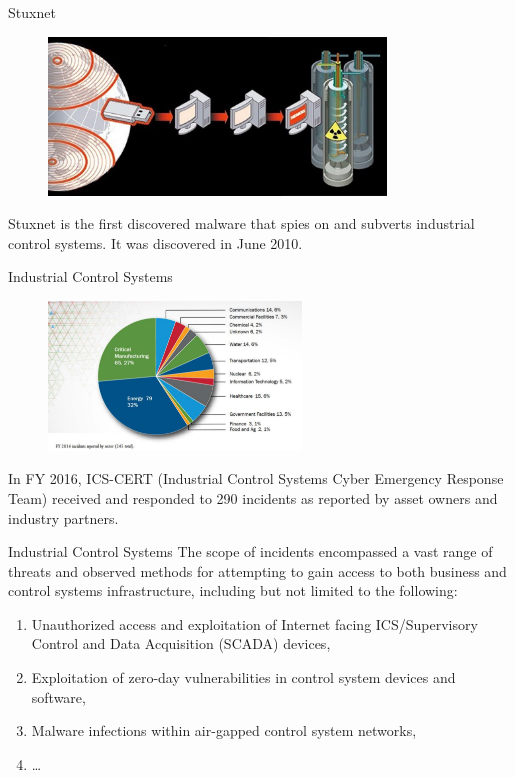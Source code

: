 \documentclass[10pt]{beamer}
\begin{document}
\begin{frame}{Stuxnet}
  \begin{figure}[ht]
    \centering
    \includegraphics[width=0.8\textwidth]{stuxnet.jpg}
  \end{figure}
  Stuxnet is the first discovered malware that spies on and subverts industrial control systems. It was discovered in June 2010. 
\end{frame}

\begin{frame}{Industrial Control Systems}
  \begin{figure}[ht]
    \centering
    \includegraphics[width=0.6\textwidth]{cert.jpg}
  \end{figure}
  In FY 2016, ICS-CERT (Industrial Control Systems Cyber Emergency Response Team) received and responded to 290 incidents as reported by asset owners and industry partners.
\end{frame}


\begin{frame}{Industrial Control Systems}
  The scope of incidents encompassed a vast range of threats and observed methods for attempting to gain access to both business and control systems infrastructure, including but not limited to the following:
  \begin{enumerate}
  \item  Unauthorized access and exploitation of Internet facing ICS/Supervisory Control and Data Acquisition (SCADA) devices,
  \item  Exploitation of zero-day vulnerabilities in control system devices and software, 
  \item  Malware infections within air-gapped control system networks,
  \item \dots
  \end{enumerate}

\end{frame}
\end{document}
